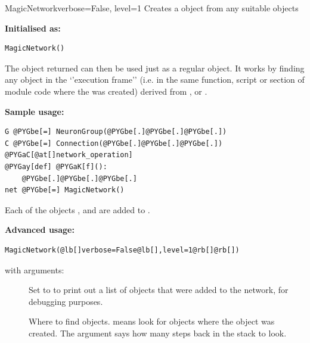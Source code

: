 \documentclass[letterpaper,10pt]{manual}
\begin{document}
\hypertarget{brian.MagicNetwork}{}\begin{classdesc}{MagicNetwork}{verbose=False, level=1}
Creates a \hyperlink{brian.Network}{} object from any suitable objects

\textbf{Initialised as:}

\begin{Verbatim}[commandchars=@\[\]]
MagicNetwork()
\end{Verbatim}

The object returned can then be used just as a regular
\hyperlink{brian.Network}{} object. It works by finding any object in
the `'execution frame'' (i.e. in the same function, script
or section of module code where the \hyperlink{brian.MagicNetwork}{} was
created) derived from \hyperlink{brian.NeuronGroup}{}, \hyperlink{brian.Connection}{} or
\hyperlink{brian.NetworkOperation}{}.

\textbf{Sample usage:}

\begin{Verbatim}[commandchars=@\[\]]
G @PYGbe[=] NeuronGroup(@PYGbe[.]@PYGbe[.]@PYGbe[.])
C @PYGbe[=] Connection(@PYGbe[.]@PYGbe[.]@PYGbe[.])
@PYGaC[@at[]network_operation]
@PYGay[def] @PYGaK[f]():
    @PYGbe[.]@PYGbe[.]@PYGbe[.]
net @PYGbe[=] MagicNetwork()
\end{Verbatim}

Each of the objects ,  and  are added to .

\textbf{Advanced usage:}

\begin{Verbatim}[commandchars=@\[\]]
MagicNetwork(@lb[]verbose=False@lb[],level=1@rb[]@rb[])
\end{Verbatim}

with arguments:
\begin{description}
\item[]
Set to  to print out a list of objects that were
added to the network, for debugging purposes.

\item[]
Where to find objects.  means look for objects
where the \hyperlink{brian.MagicNetwork}{} object was created. The 
argument says how many steps back in the stack to look.

\end{description}
\end{classdesc}
\end{document}
